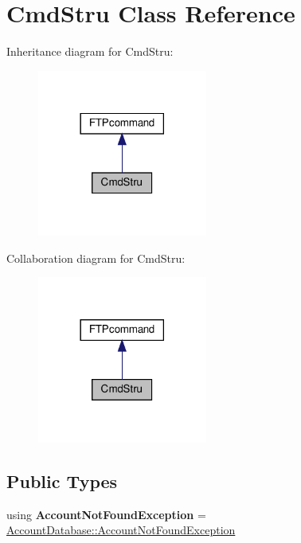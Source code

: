 \hypertarget{classCmdStru}{}\section{Cmd\+Stru Class Reference}
\label{classCmdStru}


Inheritance diagram for Cmd\+Stru\+:
\nopagebreak
\begin{figure}[H]
\begin{center}
\leavevmode
\includegraphics[width=158pt]{classCmdStru__inherit__graph}
\end{center}
\end{figure}


Collaboration diagram for Cmd\+Stru\+:
\nopagebreak
\begin{figure}[H]
\begin{center}
\leavevmode
\includegraphics[width=158pt]{classCmdStru__coll__graph}
\end{center}
\end{figure}
\subsection*{Public Types}
\begin{DoxyCompactItemize}
\item 
\mbox{\label{classCmdStru_a5ad00a8aeb7ee1e9468026e55120ada2}} 
using {\bfseries Account\+Not\+Found\+Exception} = \hyperlink{structAccountDatabase_1_1AccountNotFoundException}{Account\+Database\+::\+Account\+Not\+Found\+Exception}
\end{DoxyCompactItemize}
